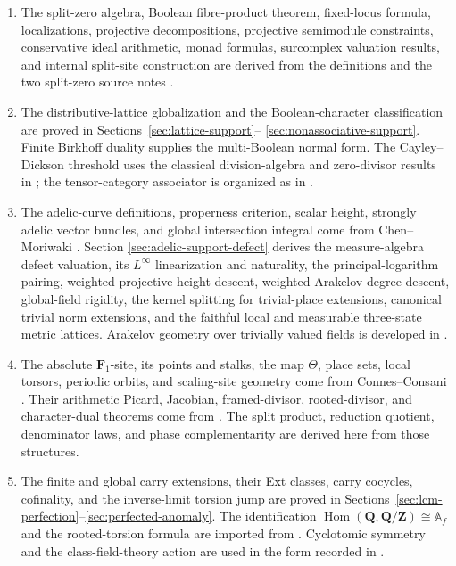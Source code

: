 \documentclass[11pt]{amsart}
\numberwithin{equation}{section}
\theoremstyle{definition}
\newcommand{\Z}{\mathbf Z}
\newcommand{\Q}{\mathbf Q}
\newcommand{\Fone}{\mathbf F_1}
\newcommand{\Hom}{\operatorname{Hom}}
\begin{document}
\begin{enumerate}[label=\textup{(\arabic*)},leftmargin=3.2em]
\item The split-zero algebra, Boolean fibre-product theorem, fixed-locus
formula, localizations, projective decompositions, projective semimodule
constraints, conservative ideal arithmetic, monad formulas, surcomplex
valuation results, and internal split-site construction are derived from
the definitions and the two split-zero source notes
\cite{Globalization,Secondary}.

\item The distributive-lattice globalization and the Boolean-character
classification are proved in Sections~\ref{sec:lattice-support}--
\ref{sec:nonassociative-support}.  Finite Birkhoff duality supplies the
multi-Boolean normal form.  The Cayley--Dickson threshold uses the
classical division-algebra and zero-divisor results in
\cite{BaezOctonions,MorenoCD,ImaedaCD,WilmotCD}; the tensor-category
associator is organized as in \cite{BHMTensor}.

\item The adelic-curve definitions, properness criterion, scalar height,
strongly adelic vector bundles, and global intersection integral come from
Chen--Moriwaki \cite{ChenMoriwakiBook,ChenMoriwakiIntersection}.  Section
\ref{sec:adelic-support-defect} derives the measure-algebra defect
valuation, its $L^\infty$ linearization and naturality, the
principal-logarithm pairing, weighted projective-height descent, weighted
Arakelov degree descent, global-field rigidity, the kernel splitting for
trivial-place extensions, canonical trivial norm extensions, and the
faithful local and measurable three-state metric lattices.  Arakelov geometry over trivially valued fields
is developed in \cite{ChenMoriwakiDirichlet}.

\item The absolute $\Fone$-site, its points and stalks, the map $\Theta$,
place sets, local torsors, periodic orbits, and scaling-site geometry come
from Connes--Consani
\cite{CCAbsolute,CCArithmeticSite,CCScalingSite}.  Their arithmetic Picard,
Jacobian, framed-divisor, rooted-divisor, and character-dual theorems come
from \cite{CCJacobian}.  The split product, reduction quotient,
denominator laws, and phase complementarity are derived here from those
structures.

\item The finite and global carry extensions, their Ext classes, carry
cocycles, cofinality, and the inverse-limit torsion jump are proved in
Sections~\ref{sec:lcm-perfection}--\ref{sec:perfected-anomaly}.  The
identification $\Hom(\Q,\Q/\Z)\cong\mathbb A_f$ and the rooted-torsion
formula are imported from \cite{CCJacobian}.  Cyclotomic symmetry and the
class-field-theory action are used in the form recorded in
\cite{BostConnes,CCBCCyclotomy,CMR}.


\end{enumerate}
\end{document}

